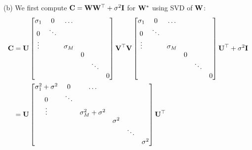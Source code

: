 (b) We first compute $\mathbf C = \mathbf W \mathbf W^\top + \sigma^2 \mathbf{I}$ for $\mathbf W^*$ using SVD of $\mathbf W$:
\begin{equation*}
\begin{aligned}
\mathbf C &= \mathbf U
\begin{bmatrix} 
    \sigma_{1} & 0 & \dots \\
    0 & \ddots & \\
    \vdots &        & \sigma_M \\ 
     &   &  & 0 \\
     & & & & \ddots & \\
     & & & & &  0
    \end{bmatrix} \mathbf V^\top \mathbf V 
    \begin{bmatrix} 
    \sigma_{1} & 0 & \dots \\
    0 & \ddots & \\
    \vdots &        & \sigma_M \\ 
     &   &  & 0 \\
     & & & & \ddots & \\
     & & & & &  0
    \end{bmatrix} \mathbf U^\top + \sigma^2 \mathbf{I} \\
&= \mathbf U
\begin{bmatrix} 
    \sigma_{1}^2 + \sigma^2 & 0 & \dots \\
    0 & \ddots & \\
    \vdots &        & \sigma_M^2 + \sigma^2 \\ 
     &   &  & \sigma^2 \\
     & & & & \ddots & \\
     & & & & &  \sigma^2
    \end{bmatrix} \mathbf U^\top
\end{aligned}
\end{equation*}

